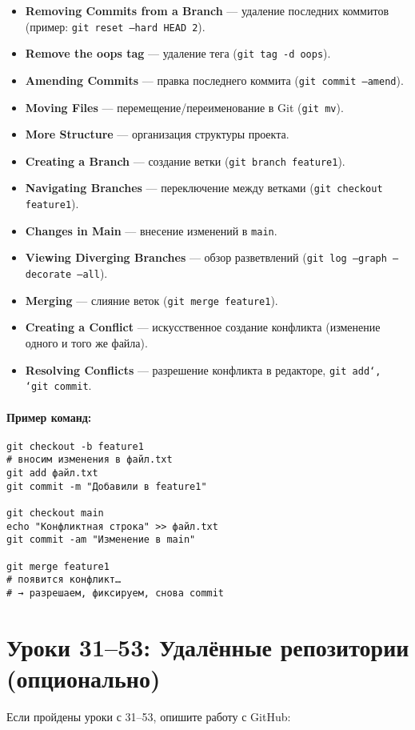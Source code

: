 \begin{itemize}
    \item \textbf{Removing Commits from a Branch} — удаление последних коммитов (пример: \texttt{git reset --hard HEAD~2}).
    \item \textbf{Remove the oops tag} — удаление тега (\texttt{git tag -d oops}).
    \item \textbf{Amending Commits} — правка последнего коммита (\texttt{git commit --amend}).
    \item \textbf{Moving Files} — перемещение/переименование в Git (\texttt{git mv}).
    \item \textbf{More Structure} — организация структуры проекта.
    \item \textbf{Creating a Branch} — создание ветки (\texttt{git branch feature1}).
    \item \textbf{Navigating Branches} — переключение между ветками (\texttt{git checkout feature1}).
    \item \textbf{Changes in Main} — внесение изменений в \texttt{main}.
    \item \textbf{Viewing Diverging Branches} — обзор разветвлений (\texttt{git log --graph --decorate --all}).
    \item \textbf{Merging} — слияние веток (\texttt{git merge feature1}).
    \item \textbf{Creating a Conflict} — искусственное создание конфликта (изменение одного и того же файла).
    \item \textbf{Resolving Conflicts} — разрешение конфликта в редакторе, \texttt{git add`, `git commit}.
\end{itemize}

\paragraph{Пример команд:}
\begin{verbatim}
git checkout -b feature1
# вносим изменения в файл.txt
git add файл.txt
git commit -m "Добавили в feature1"

git checkout main
echo "Конфликтная строка" >> файл.txt
git commit -am "Изменение в main"

git merge feature1
# появится конфликт…
# → разрешаем, фиксируем, снова commit
\end{verbatim}

\clearpage


\section{Уроки 31--53: Удалённые репозитории (опционально)}\label{sec:31-53}
Если пройдены уроки с 31–53, опишите работу с GitHub:

